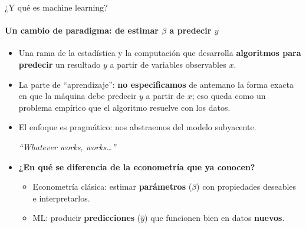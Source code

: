\documentclass{beamer}
\newcommand{\1}{\mathbb{I}}
\begin{document}
\begin{frame}{¿Y qué es machine learning?}
\framesubtitle{Un cambio de paradigma: de estimar $\beta$ a predecir $y$}
\small
\begin{itemize}\itemsep5pt
  \item Una rama de la estadística y la computación que desarrolla \textbf{algoritmos para predecir} un resultado $y$ a partir de variables observables $x$. \pause
  \item La parte de ``aprendizaje'': \textbf{no especificamos} de antemano la forma exacta en que la máquina debe predecir $y$ a partir de $x$; eso queda como un problema empírico que el algoritmo resuelve con los datos. \pause
  \item El enfoque es pragmático: nos abstraemos del modelo subyacente.
  \begin{center}
  \emph{``Whatever works, works\ldots''}
  \end{center} \pause
  \item \textbf{¿En qué se diferencia de la econometría que ya conocen?} \pause
  \begin{itemize}\itemsep3pt
    \item Econometría clásica: estimar \textbf{parámetros} ($\beta$) con propiedades deseables e interpretarlos.
    \item ML: producir \textbf{predicciones} ($\hat{y}$) que funcionen bien en datos \textbf{nuevos}.
  \end{itemize}
\end{itemize}
\end{frame}
\end{document}
